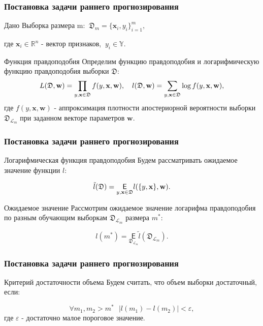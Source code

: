 \documentclass[12pt]{beamer}
\begin{document}
\begin{frame}
\frametitle{Постановка задачи раннего прогнозирования}
\begin{block}{Дано}
Выборка размера m: $~\mathfrak D_m = \{\textbf{x}_i, y_i\}_{i=1}^m,$

где $\textbf{x}_i \in \mathbb{R}^{n}$ - вектор признаков, $~y_i \in \mathbb{Y}$.
\end{block}
\begin{block}{Функция правдоподобия}
Определим функцию правдоподобия и логарифмическую функцию правдоподобия выборки $\mathfrak D$:
$$
L(\mathfrak{D}, \textbf{w}) = \prod_{y, \textbf{x} \in \mathfrak D} f(y, \textbf{x}, \textbf{w}),~~~ l(\mathfrak D, \textbf w) = \sum_{y, \textbf{x} \in \mathfrak D}\log f(y, \textbf{x}, \textbf{w}),
$$
где $f(y, \textbf{x}, \textbf{w})$ - аппроксимация плотности апостериорной вероятности выборки $\mathfrak D_{\mathcal L_m}$ при заданном векторе параметров $\textbf{w}$.
\end{block}
\end{frame}

\begin{frame}
\frametitle{Постановка задачи раннего прогнозирования}
\begin{block}{Логарифмическая функция правдоподобия}
Будем рассматривать ожидаемое значение функции $l$:

$$
\tilde{l}(\mathfrak D)  = \underset{y, \textbf{x} \in \mathfrak D}{\mathsf E} l(\{y, \textbf{x}\}, \textbf w).
$$
\end{block}
\begin{block}{Ожидаемое значение}
Рассмотрим ожидаемое значение логарифма правдоподобия по разным обучающим выборкам $\mathfrak D_{\mathcal L_m}$ размера $m^*$:

$$
l(m^*) = \underset{\mathfrak D_{\mathcal L_m}}{\mathsf E} \tilde{l}(\mathfrak D_{\mathcal L_m}).
$$
\end{block}
\end{frame}


\begin{frame}
\frametitle{Постановка задачи раннего прогнозирования}
\begin{block}{Критерий достаточности объема}
Будем считать, что объем выборки достаточный, если:

$$
\forall m_1, m_2 > m^* ~~~ |l(m_1) - l(m_2)| < \varepsilon,
$$
где $\varepsilon$ - достаточно малое пороговое значение.
\end{block}
\end{frame}
\end{document}
